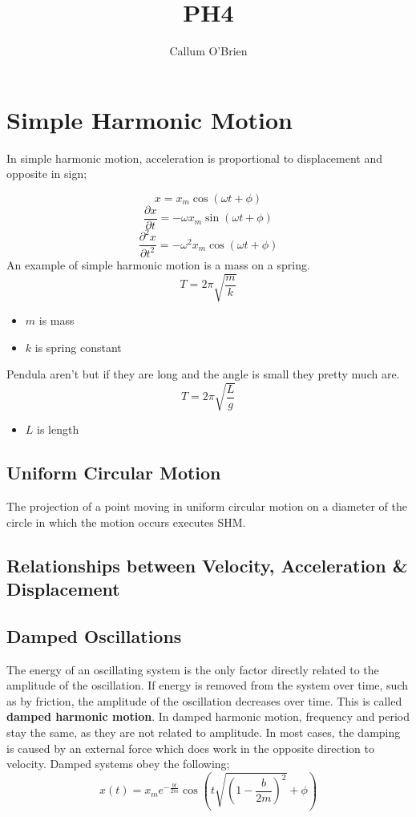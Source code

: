 \documentclass{article}
\title{PH4}
\author{Callum O'Brien}
\begin{document}
\maketitle
\tableofcontents
\newpage

\section{Simple Harmonic Motion}

\noindent In simple harmonic motion, acceleration is proportional to displacement and opposite in sign;

\[x=x_m\cos(\omega t+\phi)\]
\[\frac{\partial x}{\partial t}=-\omega x_m\sin(\omega t+\phi)\]
\[\frac{\partial^2x}{\partial t^2}=-\omega^2x_m\cos(\omega t+\phi)\]
An example of simple harmonic motion is a mass on a spring. 
\[T=2\pi\sqrt{\frac{m}{k}}\]
\begin{itemize}
	\item $m$ is mass
	\item $k$ is spring constant
\end{itemize}
Pendula aren't but if they are long and the angle is small they pretty much are.
\[T=2\pi\sqrt{\frac{L}{g}}\]
\begin{itemize}
	\item $L$ is length
\end{itemize}

\subsection{Uniform Circular Motion}
The projection of a point moving in uniform circular motion on a diameter of the circle in which the motion occurs executes SHM.

\subsection{Relationships between Velocity, Acceleration \& Displacement}

\subsection{Damped Oscillations}
The energy of an oscillating system is the only factor directly related to the amplitude of the oscillation. If energy is removed from the system over time, such as by friction, the amplitude of the oscillation decreases over time. This is called \textbf{damped harmonic motion}. In damped harmonic motion, frequency and period stay the same, as they are not related to amplitude. In most cases, the damping is caused by an external force which does work in the opposite direction to velocity. Damped systems obey the following;
\[x(t)=x_me^{-\frac{bt}{2m}}\cos\left(t\sqrt{\left(1-\frac{b}{2m}\right)^2}+\phi\right)\]
\end{document}
